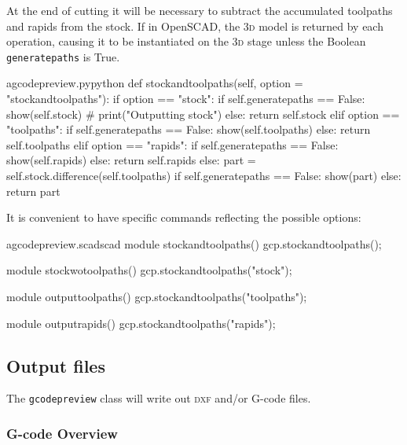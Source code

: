 \documentclass{ltxdoc}
\begin{document}
At the end of cutting it will be necessary to subtract the accumulated toolpaths and rapids from the stock. If in OpenSCAD, the \textsc{3d} model is returned by each operation, causing it to be instantiated on the \textsc{3d} stage unless the Boolean \verb|generatepaths| is True.

\lstset{firstnumber=\thegcpy}
\begin{writecode}{a}{gcodepreview.py}{python}
    def stockandtoolpaths(self, option = "stockandtoolpaths"):
        if option == "stock":
            if self.generatepaths == False:
                show(self.stock)
#                print("Outputting stock")
            else:
                return self.stock
        elif option == "toolpaths":
            if self.generatepaths == False:
                show(self.toolpaths)
            else:
                return self.toolpaths
        elif option == "rapids":
            if self.generatepaths == False:
                show(self.rapids)
            else:
                return self.rapids
        else:
            part = self.stock.difference(self.toolpaths)
            if self.generatepaths == False:
                show(part)
            else:
                return part
                    
\end{writecode}
\addtocounter{gcpy}{24}

It is convenient to have specific commands reflecting the possible options:

\lstset{firstnumber=\thegcpscad}
\begin{writecode}{a}{gcodepreview.scad}{scad}
module stockandtoolpaths(){
    gcp.stockandtoolpaths();
}

module stockwotoolpaths(){
    gcp.stockandtoolpaths("stock");
}

module outputtoolpaths(){
    gcp.stockandtoolpaths("toolpaths");
}

module outputrapids(){
    gcp.stockandtoolpaths("rapids");
}

\end{writecode}
\addtocounter{gcpscad}{16}

\subsection{Output files}

The \verb|gcodepreview| class will write out \textsc{dxf} and/or G-code files.

\subsubsection{G-code Overview}
 
\end{document}
